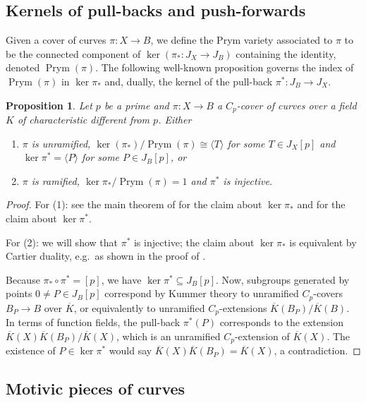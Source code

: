 \documentclass[12pt]{amsart}
\newtheorem{proposition}[theorem]{Proposition}
\theoremstyle{definition}
\theoremstyle{remark}
\DeclareMathOperator{\Prym}{Prym}
\renewcommand{\bar}{\overline}
\begin{document}
\subsection{Kernels of pull-backs and push-forwards}
Given a cover of curves $\pi: X\to B$, we define the Prym variety associated to $\pi$ to be the connected component of $\ker(\pi_*: J_X\to J_B)$ containing the identity, denoted $\Prym(\pi)$. The following well-known proposition governs the index of $\Prym(\pi)$ in $\ker\pi_*$ and, dually, the kernel of the pull-back $\pi^*:J_B\to J_X$.

\begin{proposition}\label{prop:push-pull}
    Let $p$ be a prime and $\pi: X\to B$ a $C_p$-cover of curves over a field $K$ of characteristic different from $p$. Either
    \begin{enumerate}
        \item $\pi$ is unramified, $\ker(\pi_*)/\Prym(\pi)\cong \langle T\rangle$ for some $T\in J_X[p]$ and $\ker\pi^*=\langle P\rangle$ for some $P\in J_B[p]$, or
        \item $\pi$ is ramified, $\ker\pi_*/\Prym(\pi)=1$ and $\pi^*$ is injective.
    \end{enumerate}
\end{proposition}

\begin{proof}
    For (1): see the main theorem of \cite{RosenNorms} for the claim about $\ker\pi_*$ and \cite[Lemma 2.2]{AgostiniPryms} for the claim about $\ker\pi^*$. 

    For (2): we will show that $\pi^*$ is injective; the claim about $\ker\pi_*$ is equivalent by Cartier duality, e.g.\ as shown in the proof of \cite[Proposition 3.3]{ConradStein01}.

    Because $\pi_*\circ\pi^*=[p]$, we have $\ker\pi^*\subseteq J_B[p]$. Now, subgroups generated by points $0\ne P\in J_B[p]$ correspond by Kummer theory to unramified $C_p$-covers $B_P\to B$ over $\bar{K}$, or equivalently to unramified $C_p$-extensions $\bar{K}(B_P)/\bar{K}(B)$. In terms of function fields, the pull-back $\pi^*(P)$ corresponds to the extension $\bar{K}(X)\bar{K}(B_P)/\bar{K}(X)$, which is an unramified $C_p$-extension of $\bar{K}(X)$. The existence of $P\in\ker\pi^*$ would say $\bar{K}(X)\bar{K}(B_P)=\bar{K}(X)$, a contradiction.
\end{proof}

\subsection{Motivic pieces of curves}\label{sec:motiv}
\end{document}
